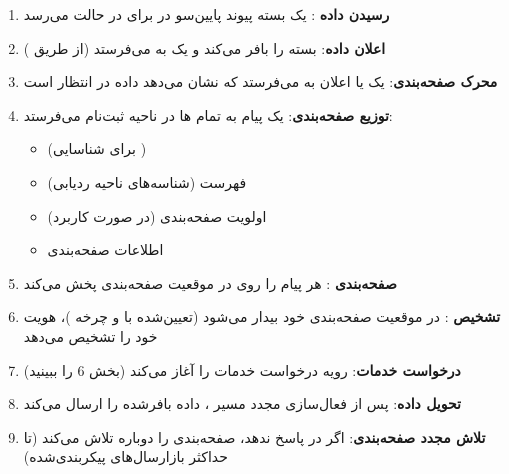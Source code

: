 \begin{enumerate}
\def\labelenumi{\arabic{enumi}.}
\tightlist
\item
  \textbf{رسیدن داده }: یک بسته پیوند پایین‌سو در  برای  در حالت  می‌رسد
\item
  \textbf{اعلان داده}:  بسته را بافر می‌کند و یک  به  می‌فرستد (از طریق )
\item
  \textbf{محرک صفحه‌بندی}:  یک  یا اعلان  به  می‌فرستد که نشان می‌دهد داده  در انتظار است
\item
  \textbf{توزیع صفحه‌بندی}:  یک پیام  به تمام ها در ناحیه ثبت‌نام  می‌فرستد:

  \begin{itemize}
  \tightlist
  \item
     (برای شناسایی )
  \item
    فهرست  (شناسه‌های ناحیه ردیابی)
  \item
    اولویت صفحه‌بندی (در صورت کاربرد)
  \item
    اطلاعات  صفحه‌بندی
  \end{itemize}
\item
  \textbf{صفحه‌بندی }: هر  پیام  را روی  در موقعیت صفحه‌بندی  پخش می‌کند
\item
  \textbf{تشخیص }:  در موقعیت صفحه‌بندی خود بیدار می‌شود (تعیین‌شده با  و چرخه )، هویت خود را تشخیص می‌دهد
\item
  \textbf{درخواست خدمات}:  رویه درخواست خدمات را آغاز می‌کند (بخش 6 را ببینید)
\item
  \textbf{تحویل داده}: پس از فعال‌سازی مجدد مسیر ،  داده  بافر‌شده را ارسال می‌کند
\item
  \textbf{تلاش مجدد صفحه‌بندی}: اگر  در  پاسخ ندهد،  صفحه‌بندی را دوباره تلاش می‌کند (تا حداکثر بازارسال‌های پیکربندی‌شده)
\end{enumerate}



